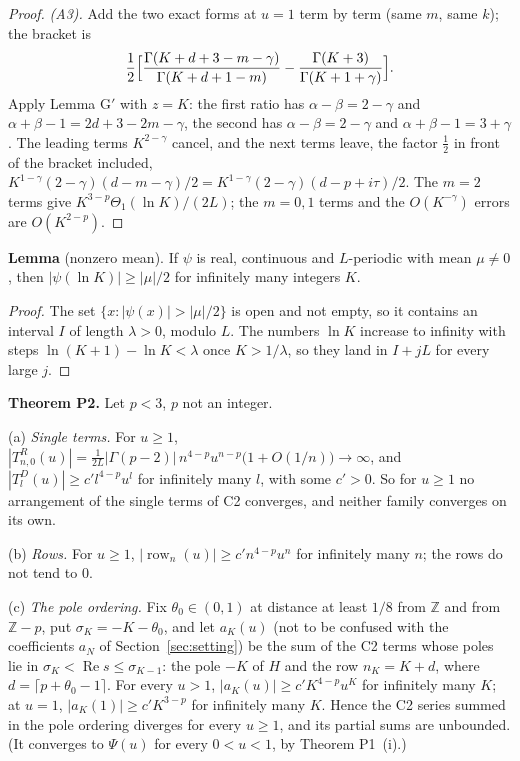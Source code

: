 \documentclass[11pt]{article}
\newcommand{\re}{\operatorname{Re}}
\newcommand{\row}{\operatorname{row}}
\begin{document}
\begin{proof}
\emph{(A3).} Add the two exact forms at $u=1$ term by term (same $m$, same $k$); the bracket is
\[
\frac12\Bigl[\frac{\Gamma(K+d+3-m-\gamma)}{\Gamma(K+d+1-m)}-\frac{\Gamma(K+3)}{\Gamma(K+1+\gamma)}\Bigr].
\]
Apply Lemma G$'$ with $z=K$: the first ratio has $\alpha-\beta=2-\gamma$ and $\alpha+\beta-1=2d+3-2m-\gamma$, the second has $\alpha-\beta=2-\gamma$ and $\alpha+\beta-1=3+\gamma$. The leading terms $K^{2-\gamma}$ cancel, and the next terms leave, the factor $\frac12$ in front of the bracket included, $K^{1-\gamma}(2-\gamma)(d-m-\gamma)/2=K^{1-\gamma}(2-\gamma)(d-p+i\tau)/2$. The $m=2$ terms give $K^{3-p}\Theta_1(\ln K)/(2L)$; the $m=0,1$ terms and the $O(K^{-\gamma})$ errors are $O(K^{2-p})$.
\end{proof}

\noindent\textbf{Lemma} (nonzero mean). If $\psi$ is real, continuous and $L$-periodic with mean $\mu\ne0$, then $|\psi(\ln K)|\ge|\mu|/2$ for infinitely many integers $K$.

\begin{proof}
The set $\{x:|\psi(x)|>|\mu|/2\}$ is open and not empty, so it contains an interval $I$ of length $\lambda>0$, modulo $L$. The numbers $\ln K$ increase to infinity with steps $\ln(K+1)-\ln K<\lambda$ once $K>1/\lambda$, so they land in $I+jL$ for every large $j$.
\end{proof}

\noindent\textbf{Theorem P2.} Let $p<3$, $p$ not an integer.

(a) \emph{Single terms.} For $u\ge1$, $|T^R_{n,0}(u)|=\frac{1}{2L}|\Gamma(p-2)|\,n^{4-p}u^{n-p}\bigl(1+O(1/n)\bigr)\to\infty$, and $|T^D_l(u)|\ge c'l^{4-p}u^l$ for infinitely many $l$, with some $c'>0$. So for $u\ge1$ no arrangement of the single terms of C2 converges, and neither family converges on its own.

(b) \emph{Rows.} For $u\ge1$, $|\row_n(u)|\ge c'n^{4-p}u^n$ for infinitely many $n$; the rows do not tend to $0$.

(c) \emph{The pole ordering.} Fix $\theta_0\in(0,1)$ at distance at least $1/8$ from $\mathbb{Z}$ and from $\mathbb{Z}-p$, put $\sigma_K=-K-\theta_0$, and let $a_K(u)$ (not to be confused with the coefficients $a_N$ of Section~\ref{sec:setting}) be the sum of the C2 terms whose poles lie in $\sigma_K<\re s\le\sigma_{K-1}$: the pole $-K$ of $H$ and the row $n_K=K+d$, where $d=\lceil p+\theta_0-1\rceil$. For every $u>1$, $|a_K(u)|\ge c'K^{4-p}u^K$ for infinitely many $K$; at $u=1$, $|a_K(1)|\ge c'K^{3-p}$ for infinitely many $K$. Hence the C2 series summed in the pole ordering diverges for every $u\ge1$, and its partial sums are unbounded. (It converges to $\Psi(u)$ for every $0<u<1$, by Theorem P1~(i).)
\end{document}
